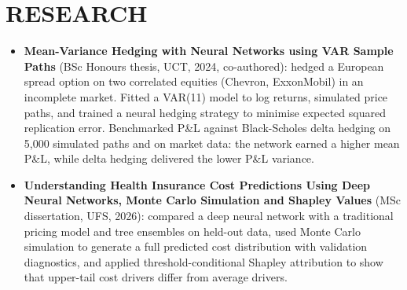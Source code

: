 \documentclass[letterpaper,11pt]{article}
\newcommand{\resumeItem}[1]{
  \item\small{
    {#1 \vspace{-1pt}}
  }
}
\newcommand{\resumeItemListStart}{\begin{itemize}[leftmargin=0.1in]}
\newcommand{\resumeItemListEnd}{\end{itemize}\vspace{-5pt}}
\begin{document}
\section{RESEARCH}
\vspace{4pt}
\resumeItemListStart
    \resumeItem{\small{\textbf{Mean-Variance Hedging with Neural Networks using VAR Sample Paths} (BSc Honours thesis, UCT, 2024, co-authored): hedged a European spread option on two correlated equities (Chevron, ExxonMobil) in an incomplete market. Fitted a VAR(11) model to log returns, simulated price paths, and trained a neural hedging strategy to minimise expected squared replication error. Benchmarked P\&L against Black-Scholes delta hedging on 5,000 simulated paths and on market data: the network earned a higher mean P\&L, while delta hedging delivered the lower P\&L variance.}}
    \vspace{2pt}
    \resumeItem{\small{\textbf{Understanding Health Insurance Cost Predictions Using Deep Neural Networks, Monte Carlo Simulation and Shapley Values} (MSc dissertation, UFS, 2026): compared a deep neural network with a traditional pricing model and tree ensembles on held-out data, used Monte Carlo simulation to generate a full predicted cost distribution with validation diagnostics, and applied threshold-conditional Shapley attribution to show that upper-tail cost drivers differ from average drivers.}}
\resumeItemListEnd
\vspace{-4pt}

\end{document}
